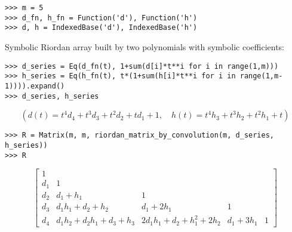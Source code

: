 \begin{verbatim}
>>> m = 5
>>> d_fn, h_fn = Function('d'), Function('h')
>>> d, h = IndexedBase('d'), IndexedBase('h')
\end{verbatim}

\begin{example}
Symbolic Riordan array built by two polynomials with symbolic coefficients:
\begin{verbatim}
>>> d_series = Eq(d_fn(t), 1+sum(d[i]*t**i for i in range(1,m)))
>>> h_series = Eq(h_fn(t), t*(1+sum(h[i]*t**i for i in range(1,m-1)))).expand()
>>> d_series, h_series
\end{verbatim}
\begin{displaymath}
\left ( d{\left (t \right )} = t^{4} d_{4} + t^{3} d_{3} + t^{2} d_{2} + t d_{1} + 1, \quad h{\left (t \right )} = t^{4} h_{3} + t^{3} h_{2} + t^{2} h_{1} + t\right )
\end{displaymath}
\begin{verbatim}
>>> R = Matrix(m, m, riordan_matrix_by_convolution(m, d_series, h_series))
>>> R
\end{verbatim}
\begin{displaymath}
\left[\begin{matrix}1 &   &   &   &  \\d_{1} & 1 &   &   &  \\d_{2} & d_{1} + h_{1} & 1 &   &  \\d_{3} & d_{1} h_{1} + d_{2} + h_{2} & d_{1} + 2 h_{1} & 1 &  \\d_{4} & d_{1} h_{2} + d_{2} h_{1} + d_{3} + h_{3} & 2 d_{1} h_{1} + d_{2} + h_{1}^{2} + 2 h_{2} & d_{1} + 3 h_{1} & 1\end{matrix}\right]
\end{displaymath}
\end{example}

